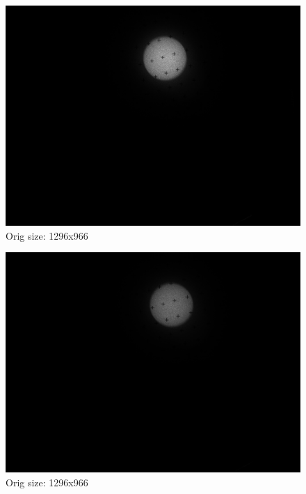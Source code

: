 \documentclass[10pt]{scrartcl}
\begin{document}
\begin{figure}[!ht]
    \centering
    \includegraphics[width=.9\textwidth]{../plots_tables_images/image_130421_153900_50149.png}    
    \caption{Orig size: 1296x966}
\end{figure}

\begin{figure}[!ht]
    \centering
    \includegraphics[width=.9\textwidth]{../plots_tables_images/image_130421_151500_37249.png}    
    \caption{Orig size: 1296x966}
\end{figure}


\end{document}
